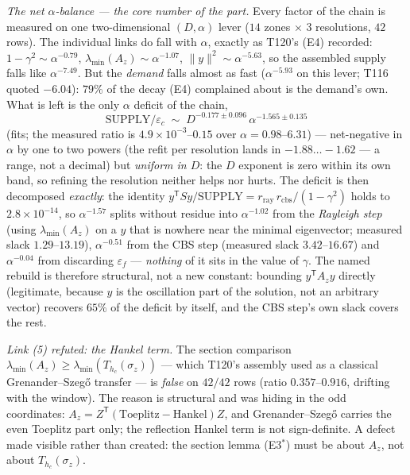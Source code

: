 \documentclass[11pt,a4paper]{article}
\begin{document}
\emph{The net $\alpha$-balance --- the core number of the part.} Every factor of the chain is
measured on one two-dimensional $(D,\alpha)$ lever ($14$ zones $\times$ $3$ resolutions, $42$
rows). The individual links do fall with $\alpha$, exactly as T120's (E4) recorded:
$1-\gamma^2\sim\alpha^{-0.79}$, $\lambda_{\min}(A_z)\sim\alpha^{-1.07}$,
$\|y\|^2\sim\alpha^{-5.63}$, so the assembled supply falls like $\alpha^{-7.49}$. But the
\emph{demand} falls almost as fast ($\alpha^{-5.93}$ on this lever; T116 quoted $-6.04$): $79\%$
of the decay (E4) complained about is the demand's own. What is left is the only $\alpha$
deficit of the chain,
\[
\mathrm{SUPPLY}/\varepsilon_c\;\sim\;D^{-0.177\pm0.096}\,\alpha^{-1.565\pm0.135}
\]
(fits; the measured ratio is $4.9\times10^{-3}$--$0.15$ over $\alpha=0.98$--$6.31$) ---
net-negative in $\alpha$ by one to two powers (the refit per resolution lands in
$-1.88\ldots-1.62$ --- a range, not a decimal) but \emph{uniform in $D$}: the $D$ exponent is
zero within its own band, so refining the resolution neither helps nor hurts. The deficit is
then decomposed \emph{exactly}: the identity
$y^{\mathsf T}Sy/\mathrm{SUPPLY}=r_{\mathrm{ray}}\,r_{\mathrm{cbs}}/(1-\gamma^2)$ holds to
$2.8\times10^{-14}$, so $\alpha^{-1.57}$ splits without residue into $\alpha^{-1.02}$ from the
\emph{Rayleigh step} (using $\lambda_{\min}(A_z)$ on a $y$ that is nowhere near the minimal
eigenvector; measured slack $1.29$--$13.19$), $\alpha^{-0.51}$ from the CBS step (measured slack
$3.42$--$16.67$) and $\alpha^{-0.04}$ from discarding $\varepsilon_f$ --- \emph{nothing} of it
sits in the value of $\gamma$. The named rebuild is therefore structural, not a new constant:
bounding $y^{\mathsf T}A_zy$ directly (legitimate, because $y$ is the oscillation part of the
solution, not an arbitrary vector) recovers $65\%$ of the deficit by itself, and the CBS step's
own slack covers the rest.

\emph{Link (5) refuted: the Hankel term.} The section comparison
$\lambda_{\min}(A_z)\ge\lambda_{\min}(T_{h_c}(\sigma_z))$ --- which T120's assembly used as a
classical Grenander--Szeg\H{o} transfer --- is \emph{false} on $42/42$ rows (ratio
$0.357$--$0.916$, drifting with the window). The reason is structural and was hiding in the odd
coordinates: $A_z=Z^{\mathsf T}(\mathrm{Toeplitz}-\mathrm{Hankel})Z$, and Grenander--Szeg\H{o}
carries the even Toeplitz part only; the reflection Hankel term is not sign-definite. A defect
made visible rather than created: the section lemma (E3$^*$) must be about $A_z$, not about
$T_{h_c}(\sigma_z)$.
\end{document}
